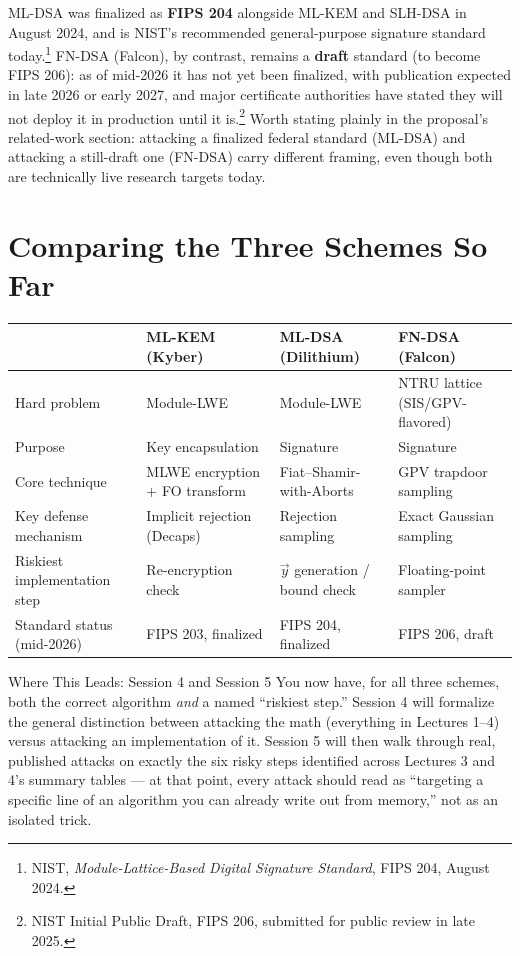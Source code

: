 ML-DSA was finalized as \textbf{FIPS 204} alongside ML-KEM and SLH-DSA in August 2024, and is NIST's recommended general-purpose signature standard today.\footnote{NIST, \emph{Module-Lattice-Based Digital Signature Standard}, FIPS 204, August 2024.} FN-DSA (Falcon), by contrast, remains a \textbf{draft} standard (to become FIPS 206): as of mid-2026 it has not yet been finalized, with publication expected in late 2026 or early 2027, and major certificate authorities have stated they will not deploy it in production until it is.\footnote{NIST Initial Public Draft, FIPS 206, submitted for public review in late 2025.} Worth stating plainly in the proposal's related-work section: attacking a finalized federal standard (ML-DSA) and attacking a still-draft one (FN-DSA) carry different framing, even though both are technically live research targets today.

\section{Comparing the Three Schemes So Far}
\label{sec:L4:comparing-the-three-schemes-so-far}

\begin{center}
\renewcommand{\arraystretch}{1.35}
\footnotesize
\begin{tabular}{|p{2.6cm}|p{3.1cm}|p{3.4cm}|p{3.4cm}|}
\hline
& \textbf{ML-KEM (Kyber)} & \textbf{ML-DSA (Dilithium)} & \textbf{FN-DSA (Falcon)} \\
\hline
Hard problem & Module-LWE & Module-LWE & NTRU lattice (SIS/GPV-flavored) \\
Purpose & Key encapsulation & Signature & Signature \\
Core technique & MLWE encryption + FO transform & Fiat--Shamir-with-Aborts & GPV trapdoor sampling \\
Key defense mechanism & Implicit rejection (Decaps) & Rejection sampling & Exact Gaussian sampling \\
Riskiest implementation step & Re-encryption check & $\vec y$ generation / bound check & Floating-point sampler \\
Standard status (mid-2026) & FIPS 203, finalized & FIPS 204, finalized & FIPS 206, draft \\
\hline
\end{tabular}
\end{center}

\begin{previewbox}{Where This Leads: Session 4 and Session 5}
You now have, for all three schemes, both the correct algorithm \emph{and} a named ``riskiest step.'' Session 4 will formalize the general distinction between attacking the math (everything in Lectures 1--4) versus attacking an implementation of it. Session 5 will then walk through real, published attacks on exactly the six risky steps identified across Lectures 3 and 4's summary tables --- at that point, every attack should read as ``targeting a specific line of an algorithm you can already write out from memory,'' not as an isolated trick.
\end{previewbox}

